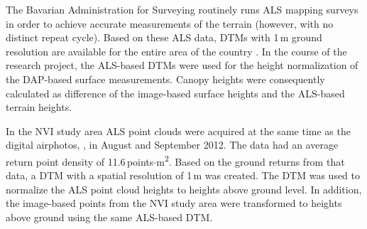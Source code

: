 The Bavarian Administration for Surveying routinely runs \ac{ALS} mapping surveys in order to achieve accurate measurements of the terrain
(however, with no distinct repeat cycle).
Based 
on these \ac{ALS} data, \acfp{DTM} with 1\,m ground resolution
are available for the entire area of the country \parencite{LDBV.2015b}.
In the course of the research project, the \ac{ALS}-based \acp{DTM} were used for the height normalization 
of the \ac{DAP}-based surface measurements.
Canopy heights were consequently calculated as difference of the image-based surface heights and the \ac{ALS}-based terrain heights.

In the \ac{NVI} study area \ac{ALS} point clouds were acquired at the same time as the digital airphotos, \ie, in August and September 2012. 
The data had an average return point density of 11.6\,points$\cdot$m\textsuperscript{2}.
Based on the ground returns from that data, a \ac{DTM} with a spatial resolution of 1\,m was created. The \ac{DTM} was used to normalize the 
\ac{ALS} point cloud heights to heights above ground level. In addition, the image-based points from the \ac{NVI} study area were transformed to heights
above ground using the same \ac{ALS}-based \ac{DTM}. 


 
    

